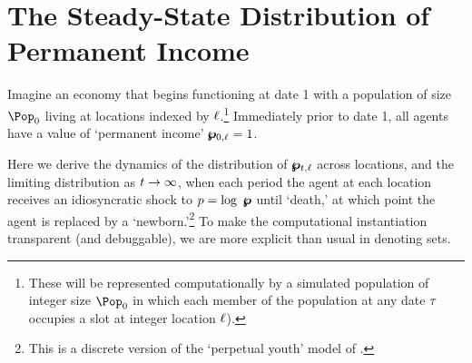 \documentclass[../BufferStockTheory.tex]{subfiles}\usepackage{ApndxSteadyState}
\begin{document}
  \section{The Steady-State Distribution of Permanent Income}
  \Biggen
  Imagine an economy that begins functioning at date 1 with a population of size $\Pop_{0}$ living at locations indexed by  $\ell$.\footnote{These will be represented computationally by a simulated population of integer size $\Pop_{0}$ in which each member of the population at any date $\tau$ occupies a slot at integer location $\ell$).}  Immediately prior to date 1, all agents have a value of `permanent income' $\pmb{\wp}_{0,\ell}=1$. 

  Here we derive the dynamics of the distribution of $\pmb{\wp}_{t,\ell}$ across locations, and the limiting distribution as $t \rightarrow \infty$, when each period the agent at each location receives an idiosyncratic shock to $p = \log ~ \pmb{\wp}$ until `death,' at which point the agent is replaced by a `newborn.'\footnote{This is a discrete version of the `perpetual youth' model of  \cite{blanchardFinite}.} To make the computational instantiation transparent (and debuggable), we are more explicit than usual in denoting sets.


\end{document}
